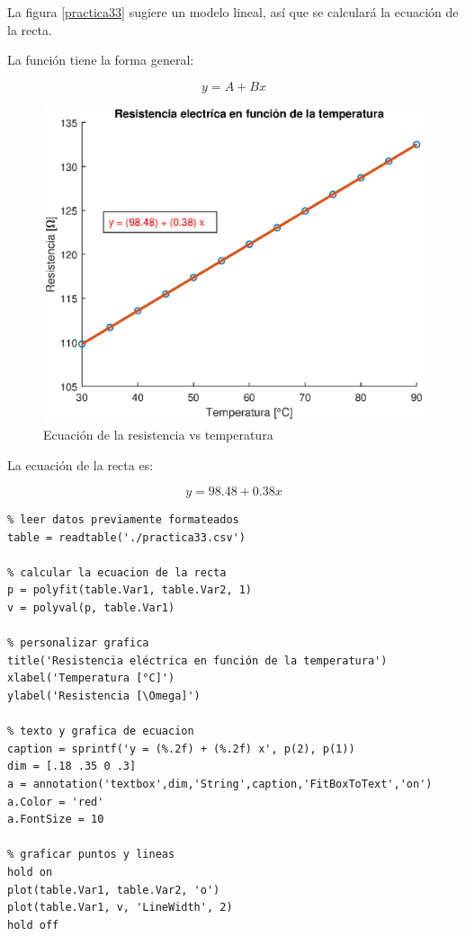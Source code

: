 \documentclass[letter,11pt]{article}
\begin{document}
La figura \ref{practica33} sugiere un modelo lineal, así que se calculará la
ecuación de la recta.

La función tiene la forma general:

\begin{equation}
    y = A + B x
\end{equation}

\begin{figure}[!h]
\centering
\includegraphics[scale=1.00]{eps/3.3.2.eps}
\caption{Ecuación de la resistencia vs temperatura}
\label{practica33_2}
\end{figure}

La ecuación de la recta es:

\begin{equation}
    y = 98.48 + 0.38 x
\end{equation}

\footnotesize
\begin{verbatim}
% leer datos previamente formateados
table = readtable('./practica33.csv')

% calcular la ecuacion de la recta
p = polyfit(table.Var1, table.Var2, 1)
v = polyval(p, table.Var1)

% personalizar grafica
title('Resistencia eléctrica en función de la temperatura')
xlabel('Temperatura [°C]')
ylabel('Resistencia [\Omega]')

% texto y grafica de ecuacion
caption = sprintf('y = (%.2f) + (%.2f) x', p(2), p(1))
dim = [.18 .35 0 .3]
a = annotation('textbox',dim,'String',caption,'FitBoxToText','on')
a.Color = 'red'
a.FontSize = 10

% graficar puntos y lineas
hold on
plot(table.Var1, table.Var2, 'o')
plot(table.Var1, v, 'LineWidth', 2)
hold off
\end{verbatim}
\normalsize
\end{document}
